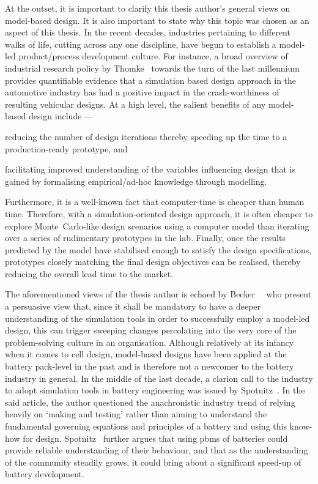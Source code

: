 At the outset, it is important to  clarify this thesis author's general views on
model-based design. It is  also important to state why this  topic was chosen as
an  aspect of  this  thesis. In  the recent  decades,  industries pertaining  to
different  walks of  life,  cutting across  any one  discipline,  have begun  to
establish a model-led product/process development culture. For instance, a broad
overview of  industrial research policy by  Thomke~\cite{Thomke1998} towards the
turn of  the last  millennium provides quantifiable  evidence that  a simulation
based design  approach in the automotive  industry has had a  positive impact in
the  crash-worthiness of  resulting  vehicular  designs. At  a  high level,  the
salient benefits of any model-based design include ---
\begin{enumerate*}[label=\itshape\alph*\upshape)]
    \item reducing the number of design iterations thereby speeding up the time to a production-ready prototype, and
    \item facilitating improved understanding of the variables influencing design that is gained by formalising empirical/ad-hoc knowledge through modelling.
\end{enumerate*}
Furthermore, it  is a well-known fact  that computer-time is cheaper  than human
time. Therefore, with a simulation-oriented design approach, it is often cheaper
to  explore  Monte~Carlo-like  design  scenarios using  a  computer  model  than
iterating over a series of rudimentary  prototypes in the lab. Finally, once the
results predicted  by the  model have  stabilised enough  to satisfy  the design
specifications, prototypes closely  matching the final design  objectives can be
realised, thereby reducing the overall lead time to the market.

The   aforementioned    views   of    the   thesis    author   is    echoed   by
Becker~\etal~\cite{Becker2005}  who present  a  persuasive view  that, since  it
shall be  mandatory to have  a deeper understanding  of the simulation  tools in
order  to successfully  employ a  model-led  design, this  can trigger  sweeping
changes percolating  into the  very core  of the  problem-solving culture  in an
organisation. Although relatively  at its infancy when it comes  to cell design,
model-based designs have been applied at  the battery pack-level in the past and
is therefore not a newcomer to the battery industry in general. In the middle of
the last  decade, a clarion  call to the industry  to adopt simulation  tools in
battery  engineering was  issued  by Spotnitz~\cite{Spotnitz2005}.  In the  said
article,  the author  questioned  the anachronistic  industry  trend of  relying
heavily on `making and testing' rather than aiming to understand the fundamental
governing equations  and principles  of a  battery and  using this  know-how for
design. Spotnitz~\cite{Spotnitz2005}  further argues  that using  \glspl{pbm} of
batteries could provide  reliable understanding of their behaviour,  and that as
the  understanding of  the  community steadily  grows, it  could  bring about  a
significant speed-up of battery development.

